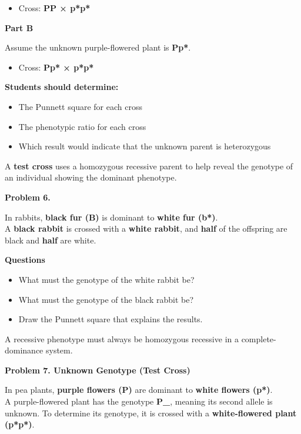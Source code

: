 \documentclass[
  letterpaper,
  DIV=11,
  numbers=noendperiod]{scrreprt}
\providecommand{\tightlist}{%
  \setlength{\itemsep}{0pt}\setlength{\parskip}{0pt}}
\begin{document}
\begin{itemize}
\tightlist
\item
  Cross: \textbf{PP × p*p*}
\end{itemize}

\textbf{Part B}

Assume the unknown purple-flowered plant is \textbf{Pp*}.

\begin{itemize}
\tightlist
\item
  Cross: \textbf{Pp* × p*p*}
\end{itemize}

\textbf{Students should determine:}

\begin{itemize}
\item
  The Punnett square for each cross
\item
  The phenotypic ratio for each cross
\item
  Which result would indicate that the unknown parent is heterozygous
\end{itemize}

A \textbf{test cross} uses a homozygous recessive parent to help reveal
the genotype of an individual showing the dominant phenotype.

\textbf{Problem 6.}

In rabbits, \textbf{black fur (B)} is dominant to \textbf{white fur
(b*)}.\\
A \textbf{black rabbit} is crossed with a \textbf{white rabbit}, and
\textbf{half} of the offspring are black and \textbf{half} are white.

\textbf{Questions}

\begin{itemize}
\item
  What must the genotype of the white rabbit be?
\item
  What must the genotype of the black rabbit be?
\item
  Draw the Punnett square that explains the results.
\end{itemize}

A recessive phenotype must always be homozygous recessive in a
complete-dominance system.

\textbf{Problem 7. Unknown Genotype (Test Cross)}

In pea plants, \textbf{purple flowers (P)} are dominant to \textbf{white
flowers (p*)}.\\
A purple-flowered plant has the genotype \textbf{P\_}, meaning its
second allele is unknown. To determine its genotype, it is crossed with
a \textbf{white-flowered plant (p*p*)}.
\end{document}
